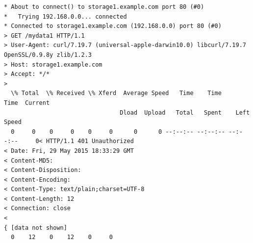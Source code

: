 \documentclass[11pt,a4paper]{ivoa}
\begin{document}
\begin{lstlisting}
* About to connect() to storage1.example.com port 80 (#0)
*   Trying 192.168.0.0... connected
* Connected to storage1.example.com (192.168.0.0) port 80 (#0)
> GET /mydata1 HTTP/1.1
> User-Agent: curl/7.19.7 (universal-apple-darwin10.0) libcurl/7.19.7 OpenSSL/0.9.8y zlib/1.2.3
> Host: storage1.example.com
> Accept: */*
>
  \% Total  \% Received \% Xferd  Average Speed   Time    Time     Time  Current
                                 Dload  Upload   Total   Spent    Left  Speed
  0     0    0     0    0     0      0      0 --:--:-- --:--:-- --:--:--     0< HTTP/1.1 401 Unauthorized
< Date: Fri, 29 May 2015 18:33:29 GMT
< Content-MD5:
< Content-Disposition:
< Content-Encoding:
< Content-Type: text/plain;charset=UTF-8
< Content-Length: 12
< Connection: close
<
{ [data not shown]
  0    12    0    12    0     0   
 \end{lstlisting}
\end{document}
